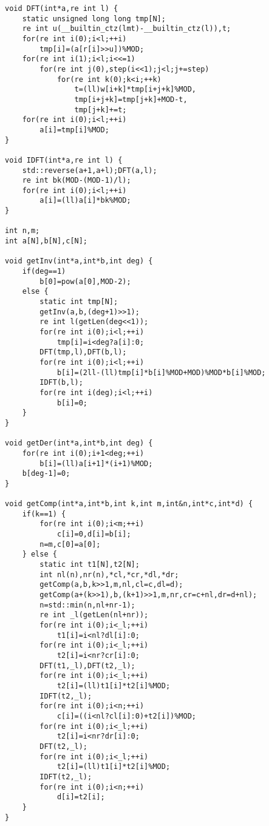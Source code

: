 \documentclass[12pt]{ctexart}
\begin{document}
\begin{lstlisting}
void DFT(int*a,re int l) {
	static unsigned long long tmp[N];
	re int u(__builtin_ctz(lmt)-__builtin_ctz(l)),t;
	for(re int i(0);i<l;++i)
		tmp[i]=(a[r[i]>>u])%MOD;
	for(re int i(1);i<l;i<<=1)
		for(re int j(0),step(i<<1);j<l;j+=step)
			for(re int k(0);k<i;++k)
				t=(ll)w[i+k]*tmp[i+j+k]%MOD,
				tmp[i+j+k]=tmp[j+k]+MOD-t,
				tmp[j+k]+=t;
	for(re int i(0);i<l;++i)
		a[i]=tmp[i]%MOD;
}

void IDFT(int*a,re int l) {
	std::reverse(a+1,a+l);DFT(a,l);
	re int bk(MOD-(MOD-1)/l);
	for(re int i(0);i<l;++i)
		a[i]=(ll)a[i]*bk%MOD;
}

int n,m;
int a[N],b[N],c[N];

void getInv(int*a,int*b,int deg) {
    if(deg==1)
        b[0]=pow(a[0],MOD-2);
    else {
        static int tmp[N];
        getInv(a,b,(deg+1)>>1);
        re int l(getLen(deg<<1));
        for(re int i(0);i<l;++i)
            tmp[i]=i<deg?a[i]:0;
        DFT(tmp,l),DFT(b,l);
        for(re int i(0);i<l;++i)
            b[i]=(2ll-(ll)tmp[i]*b[i]%MOD+MOD)%MOD*b[i]%MOD;
        IDFT(b,l);
        for(re int i(deg);i<l;++i)
            b[i]=0;
    }
}

void getDer(int*a,int*b,int deg) {
    for(re int i(0);i+1<deg;++i)
        b[i]=(ll)a[i+1]*(i+1)%MOD;
    b[deg-1]=0;
}

void getComp(int*a,int*b,int k,int m,int&n,int*c,int*d) {
    if(k==1) {
        for(re int i(0);i<m;++i)
            c[i]=0,d[i]=b[i];
        n=m,c[0]=a[0];
    } else {
        static int t1[N],t2[N];
        int nl(n),nr(n),*cl,*cr,*dl,*dr;
        getComp(a,b,k>>1,m,nl,cl=c,dl=d);
        getComp(a+(k>>1),b,(k+1)>>1,m,nr,cr=c+nl,dr=d+nl);
        n=std::min(n,nl+nr-1);
        re int _l(getLen(nl+nr));
        for(re int i(0);i<_l;++i)
            t1[i]=i<nl?dl[i]:0;
        for(re int i(0);i<_l;++i)
            t2[i]=i<nr?cr[i]:0;
        DFT(t1,_l),DFT(t2,_l);
        for(re int i(0);i<_l;++i)
            t2[i]=(ll)t1[i]*t2[i]%MOD;
        IDFT(t2,_l);
        for(re int i(0);i<n;++i)
            c[i]=((i<nl?cl[i]:0)+t2[i])%MOD;
        for(re int i(0);i<_l;++i)
            t2[i]=i<nr?dr[i]:0;
        DFT(t2,_l);
        for(re int i(0);i<_l;++i)
            t2[i]=(ll)t1[i]*t2[i]%MOD;
        IDFT(t2,_l);
        for(re int i(0);i<n;++i)
            d[i]=t2[i];
    }
}


\end{lstlisting}
\end{document}

